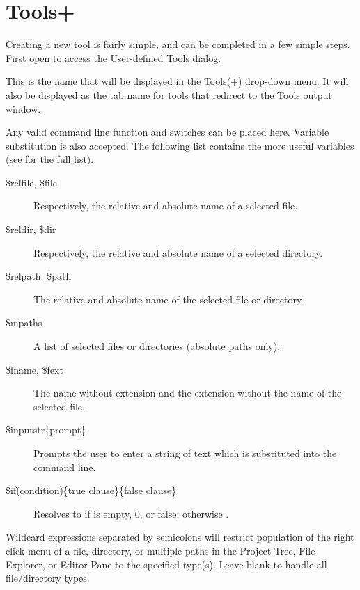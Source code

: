 \section{Tools+}\label{sec:tools+}

Creating a new tool is fairly simple, and can be completed in a few simple steps. First open  to access the User-defined Tools dialog.



This is the name that will be displayed in the Tools(+) drop-down menu. It will also be displayed as the tab name for tools that redirect to the Tools output window.


Any valid command line function and switches can be placed here. Variable substitution is also accepted. The following list contains the more useful variables (see  for the full list).

\begin{description}
\item[\$relfile, \$file] Respectively, the relative and absolute name of a selected file.
\item[\$reldir, \$dir] Respectively, the relative and absolute name of a selected directory.
\item[\$relpath, \$path] The relative and absolute name of the selected file or directory.
\item[\$mpaths] A list of selected files or directories (absolute paths only).
\item[\$fname, \$fext] The name without extension and the extension without the name of the selected file.
\item[\$inputstr\{prompt\}] Prompts the user to enter a string of text which is substituted into the command line.
\item[\$if(condition)\{true clause\}\{false clause\}] Resolves to  if  is empty, 0, or false; otherwise .
\end{description}


Wildcard expressions separated by semicolons will restrict population of the right click menu of a file, directory, or multiple paths in the Project Tree, File Explorer, or Editor Pane to the specified type(s). Leave blank to handle all file/directory types.


